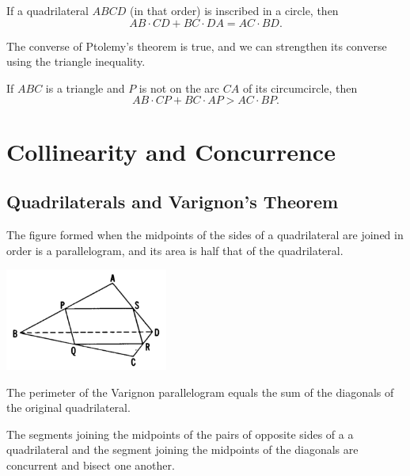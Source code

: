 \documentclass[DIV=12, a4]{scrartcl}
\begin{document}
\begin{theorem}[Ptolemy]
	If a quadrilateral $ABCD$ (in that order) is inscribed in a circle, then
	$$
	AB \cdot CD + BC \cdot DA = AC \cdot BD.
	$$
\end{theorem}

The converse of Ptolemy's theorem is true, and we can strengthen its converse using the triangle inequality.

\begin{theorem}
	If $ABC$ is a triangle and $P$ is not on the arc $CA$ of its circumcircle, then
	$$
	AB \cdot CP + BC \cdot AP > AC \cdot BP.
	$$
\end{theorem}

\section{Collinearity and Concurrence}

\subsection{Quadrilaterals and Varignon's Theorem}

\begin{theorem}
	The figure formed when the midpoints of the sides of a quadrilateral are joined in order is a parallelogram, and its area is half that of the quadrilateral.
\end{theorem}

 \begin{center}
		\includegraphics[width=0.4\textwidth]{media/3-1B}
\end{center}

\begin{lemma}
	The perimeter of the Varignon parallelogram equals the sum of the diagonals of the original quadrilateral.
\end{lemma}

\begin{theorem}
	The segments joining the midpoints of the pairs of opposite sides of a a quadrilateral and the segment joining the midpoints of the diagonals are concurrent and bisect one another. 
\end{theorem}
\end{document}
